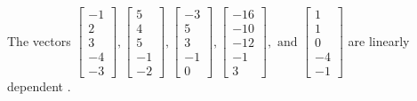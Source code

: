 \begin{exercise}
\begin{exerciseStatement}
  \end{exerciseStatement}
  \begin{exerciseAnswer}
   The vectors \(\left[\begin{array}{r}
-1 \\
2 \\
3 \\
-4 \\
-3
\end{array}\right] , \left[\begin{array}{r}
5 \\
4 \\
5 \\
-1 \\
-2
\end{array}\right] , \left[\begin{array}{r}
-3 \\
5 \\
3 \\
-1 \\
0
\end{array}\right] , \left[\begin{array}{r}
-16 \\
-10 \\
-12 \\
-1 \\
3
\end{array}\right] , \text{ and } \left[\begin{array}{r}
1 \\
1 \\
0 \\
-4 \\
-1
\end{array}\right]\) are 
  	 linearly dependent  .
  


  \end{exerciseAnswer}
\end{exercise}